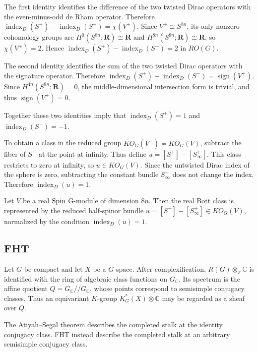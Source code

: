 \documentclass[12pt]{article}
\begin{document}
The first identity identifies the difference of the two twisted Dirac
operators with the even-minus-odd de Rham operator. Therefore
$\operatorname{index}_D(S^+)-\operatorname{index}_D(S^-)
=\chi(V^+)$. Since $V^+\cong S^{8n}$, its only nonzero cohomology groups are
$H^0(S^{8n};\mathbf R)\cong\mathbf R$ and
$H^{8n}(S^{8n};\mathbf R)\cong\mathbf R$, so
$\chi(V^+)=2$. Hence
$\operatorname{index}_D(S^+)-\operatorname{index}_D(S^-)=2$ in $RO(G)$.

The second identity identifies the sum of the two twisted Dirac operators
with the signature operator. Therefore
$\operatorname{index}_D(S^+)+\operatorname{index}_D(S^-)
=\operatorname{sign}(V^+)$. Since
$H^{4n}(S^{8n};\mathbf R)=0$, the middle-dimensional intersection form is
trivial, and thus $\operatorname{sign}(V^+)=0$.

Together these two identities imply that
$\operatorname{index}_D(S^+)=1$ and
$\operatorname{index}_D(S^-)=-1$.

To obtain a class in the reduced group
$\widetilde{KO}_G(V^+)=KO_G(V)$, subtract the fiber of $S^+$ at the point at
infinity. Thus define
$u=[S^+]-[S^+_\infty]$. This class restricts to zero at infinity, so
$u\in KO_G(V)$. Since the untwisted Dirac index of the sphere is zero, subtracting the constant bundle $S^+_\infty$ does not change the index.
Therefore
$\operatorname{index}_D(u)=1$.

\begin{theorem}
    Let $V$ be a real $\operatorname{Spin}$ G-module of dimension $8n$. Then the real Bott class is represented by the reduced half-spinor bundle
$u=[S^+]-[S^+_\infty]\in KO_G(V)$, normalized by the condition
$\operatorname{index}_D(u)=1$.
\end{theorem}

\subsection{FHT}
Let $G$ be compact and let $X$ be a $G$-space. After complexification,
$R(G)\otimes_{\mathbb Z}\mathbb C$ is identified with the ring of algebraic
class functions on $G_\mathbb C$. Its spectrum is the affine quotient
$Q=G_\mathbb C//G_\mathbb C$, whose points correspond to semisimple conjugacy
classes. Thus an equivariant $K$-group $K_G^*(X)\otimes \mathbb C$ may be regarded as
a sheaf over $Q$. 

The Atiyah--Segal theorem describes the completed stalk at
the identity conjugacy class. FHT instead describe the completed stalk at an
arbitrary semisimple conjugacy class.
\end{document}
